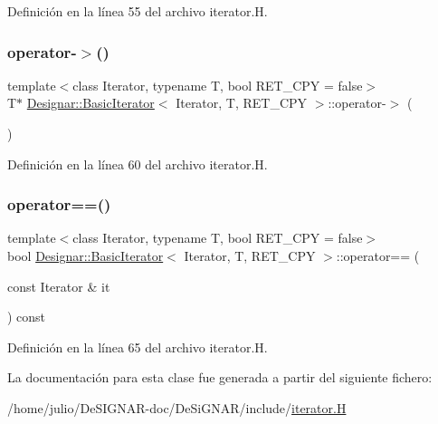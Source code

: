 Definición en la línea 55 del archivo iterator.\+H.

\mbox{\label{class_designar_1_1_basic_iterator_ac87226512fbbe7c524cc0be8ae2ee914}} 
\subsubsection{\texorpdfstring{operator-\/$>$()}{operator->()}}
{\footnotesize\ttfamily template$<$class Iterator, typename T, bool R\+E\+T\+\_\+\+C\+PY = false$>$ \\
T$\ast$ \hyperlink{class_designar_1_1_basic_iterator}{Designar\+::\+Basic\+Iterator}$<$ Iterator, T, R\+E\+T\+\_\+\+C\+PY $>$\+::operator-\/$>$ (\begin{DoxyParamCaption}{ }\end{DoxyParamCaption})\hspace{0.3cm}{\ttfamily [inline]}}



Definición en la línea 60 del archivo iterator.\+H.

\mbox{\label{class_designar_1_1_basic_iterator_abaca601c4d1d4ff27429426437abbf02}} 
\subsubsection{\texorpdfstring{operator==()}{operator==()}}
{\footnotesize\ttfamily template$<$class Iterator, typename T, bool R\+E\+T\+\_\+\+C\+PY = false$>$ \\
bool \hyperlink{class_designar_1_1_basic_iterator}{Designar\+::\+Basic\+Iterator}$<$ Iterator, T, R\+E\+T\+\_\+\+C\+PY $>$\+::operator== (\begin{DoxyParamCaption}\item[{const Iterator \&}]{it }\end{DoxyParamCaption}) const\hspace{0.3cm}{\ttfamily [inline]}}



Definición en la línea 65 del archivo iterator.\+H.



La documentación para esta clase fue generada a partir del siguiente fichero\+:\begin{DoxyCompactItemize}
\item 
/home/julio/\+De\+S\+I\+G\+N\+A\+R-\/doc/\+De\+Si\+G\+N\+A\+R/include/\hyperlink{iterator_8_h}{iterator.\+H}\end{DoxyCompactItemize}

